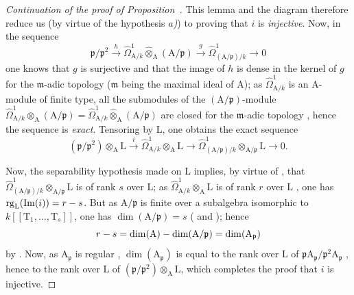 \begin{proof}[Continuation of the proof of Proposition~{\rm{}}]
This lemma and the diagram  therefore reduce us (by virtue of the hypothesis \emph{$a$)}) to proving that $i$ is \emph{injective}.
Now, in the sequence
\begin{equation}
\label{0.22.7.2.6}
  \mathfrak{p}/\mathfrak{p}^2\xrightarrow{h}
  \widehat{\Omega}^1_{\mathrm{A}/k}\widehat{\otimes}_\mathrm{A}(\mathrm{A}/\mathfrak{p})
  \xrightarrow{g}\widehat{\Omega}^1_{(\mathrm{A}/\mathfrak{p})/k}\to 0
  \tag{22.7.2.6}
\end{equation}
one knows  that $g$ is surjective and that the image of $h$ is dense in the kernel of $g$ for the $\mathfrak{m}$-adic topology ($\mathfrak{m}$ being the maximal ideal of $\mathrm{A}$); as $\widehat{\Omega}^1_{\mathrm{A}/k}$ is an $\mathrm{A}$-module of finite type, all the submodules of the $(\mathrm{A}/\mathfrak{p})$-module $\widehat{\Omega}^1_{\mathrm{A}/k}\otimes_\mathrm{A}(\mathrm{A}/\mathfrak{p})
=\widehat{\Omega}^1_{\mathrm{A}/k}\widehat{\otimes}_\mathrm{A}(\mathrm{A}/\mathfrak{p})$
are closed for the $\mathfrak{m}$-adic topology , hence the sequence  is \emph{exact}.
Tensoring by $\mathrm{L}$, one obtains the exact sequence
\[
  (\mathfrak{p}/\mathfrak{p}^2)\otimes_\mathrm{A}\mathrm{L}\xrightarrow{i}
  \widehat{\Omega}^1_{\mathrm{A}/k}\otimes_\mathrm{A}\mathrm{L}\to
  \widehat{\Omega}^1_{(\mathrm{A}/\mathfrak{p})/k}\otimes_{\mathrm{A}/\mathfrak{p}}\mathrm{L}\to 0.
\]

Now, the separability hypothesis made on $\mathrm{L}$ implies, by virtue of , that $\widehat{\Omega}^1_{(\mathrm{A}/\mathfrak{p})/k}\otimes_{\mathrm{A}/\mathfrak{p}}\mathrm{L}$ is of rank $s$ over $\mathrm{L}$; as $\widehat{\Omega}^1_{\mathrm{A}/k}\otimes_\mathrm{A}\mathrm{L}$ is of rank $r$ over $\mathrm{L}$ , one has $\operatorname{rg}_\mathrm{L}(\operatorname{Im}(i))=r- s$.
But as $\mathrm{A}/\mathfrak{p}$ is finite over a subalgebra isomorphic to $k[[\mathrm{T}_1,\ldots,\mathrm{T}_s]]$, one has $\dim(\mathrm{A}/\mathfrak{p})=s$ ( and ); hence
\[
  r- s=\dim(\mathrm{A})-\dim(\mathrm{A}/\mathfrak{p})=\dim(\mathrm{A}_\mathfrak{p})
\]
by .
Now, as $\mathrm{A}_\mathfrak{p}$ is regular , $\dim(\mathrm{A}_\mathfrak{p})$ is equal to the rank over $\mathrm{L}$ of $\mathfrak{p}\mathrm{A}_\mathfrak{p}/\mathfrak{p}^2\mathrm{A}_\mathfrak{p}$ , hence to the rank over $\mathrm{L}$ of $(\mathfrak{p}/\mathfrak{p}^2)\otimes_\mathrm{A}\mathrm{L}$, which completes the proof that $i$ is injective.
\end{proof}

